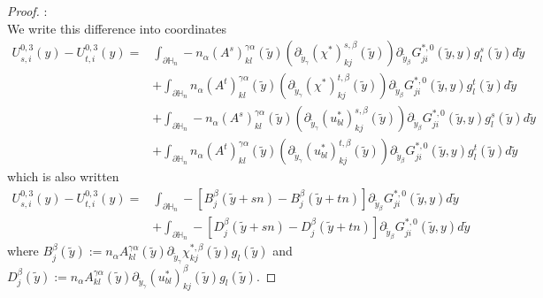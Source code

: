 \documentclass[10pt,a4paper]{amsart}
\begin{document}
\begin{proof}[Proof]
		:\\
		\noindent	We write this difference into coordinates 
		\begin{align*}
			U_{s,i}^{0,3}(y)- 	U_{t,i}^{0,3}(y)
			=&\int_{\partial\mathbb{H}_n}-n_\alpha (A^s)^{\gamma\alpha}_{kl} (\tilde{y})\left(\partial_{ \tilde{y}_\gamma} (\chi^{*})^{s,\beta}_{kj}\left(\tilde{y} \right)  \right) \partial_{ \tilde{y}_\beta} G^{*,0}_{ji}\left(\tilde{y},y\right)  g^s_l(\tilde{y}) d\tilde{y}\\
			&+	\int_{\partial\mathbb{H}_n}n_\alpha (A^t)^{\gamma\alpha}_{kl} (\tilde{y})\left(\partial_{ \tilde{y}_\gamma} (\chi^{*})^{t,\beta}_{kj}\left(\tilde{y} \right)  \right) \partial_{ \tilde{y}_\beta} G^{*,0}_{ji}\left(\tilde{y},y\right)  g^t_l(\tilde{y}) d\tilde{y}\\
			& +\int_{\partial\mathbb{H}_n}-n_\alpha (A^s)^{\gamma\alpha}_{kl} (\tilde{y})\left(\partial_{ \tilde{y}_\gamma} (u_{bl}^{*})^{s,\beta}_{kj} \left(\tilde{y} \right)\right) \partial_{ \tilde{y}_\beta} G^{*,0}_{ji}\left(\tilde{y},y\right)  g^s_l(\tilde{y}) d\tilde{y}\\
			&+\int_{\partial\mathbb{H}_n}n_\alpha (A^t)^{\gamma\alpha}_{kl} (\tilde{y})\left(\partial_{ \tilde{y}_\gamma}(u_{bl}^{*})^{t,\beta}_{kj}  \left(\tilde{y} \right)\right) \partial_{ \tilde{y}_\beta} G^{*,0}_{ji}\left(\tilde{y},y\right)  g^t_l(\tilde{y}) d\tilde{y}
		\end{align*}
		which is also written
		\begin{align*}
			U_{s,i}^{0,3}(y)- 	U_{t,i}^{0,3}(y)
			=&\int_{\partial\mathbb{H}_n}- [B^{\beta}_{j}\left(\tilde{y}+sn \right) -B^{\beta}_{j}\left(\tilde{y}+tn \right)]    \partial_{ \tilde{y}_\beta} G^{*,0}_{ji}\left(\tilde{y},y\right) d\tilde{y}\\
			&+\int_{\partial\mathbb{H}_n}- [D^{\beta}_{j}\left(\tilde{y}+sn \right) -D^{\beta}_{j}\left(\tilde{y}+tn \right)]    \partial_{ \tilde{y}_\beta} G^{*,0}_{ji}\left(\tilde{y},y\right) d\tilde{y}
		\end{align*}
		where  $B_j^{\beta}(\tilde{y}):=n_\alpha A^{\gamma\alpha}_{kl}(\tilde{y})\partial_{ \tilde{y}_\gamma} \chi_{kj}^{*,\beta}(\tilde{y}) g_l(\tilde{y}) $ and   $D_j^{\beta}(\tilde{y}):=n_\alpha A^{\gamma\alpha}_{kl}(\tilde{y})\partial_{ \tilde{y}_\gamma}(u_{bl}^{*})^{\beta}_{kj} (\tilde{y}) g_l(\tilde{y}). $ 
		

\end{proof}
\end{document}
